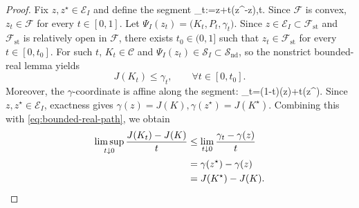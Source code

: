 \documentclass[letterpaper,10pt,conference]{ieeeconf}
\def\[#1\]{\begin{align*}#1\end{align*}}
\providecommand{\cC}{\mathcal{C}}
\providecommand{\cF}{\mathcal{F}}
\providecommand{\cS}{\mathcal{S}}
\providecommand{\cE}{\mathcal{E}}
\renewcommand{\^}[1]{^{(#1)}}
\begin{document}
\vspace{-0.1cm}
\begin{proof}
Fix $z,z^\star\in\cE_I$ and define the segment
\[
z_t:=z+t(z^\star-z),\qquad t\in[0,1].
\]
Since $\cF$ is convex, $z_t\in\cF$ for every $t\in[0,1]$. Let $
\Psi_I(z_t)=\bigl(K_t,P_t,\gamma_t\bigr). $
Since $z\in\cE_I\subset\cF_{\mathrm{st}}$ and $\cF_{\mathrm{st}}$ is relatively open in $\cF$, there exists $t_0\in(0,1]$ such that $z_t\in\cF_{\mathrm{st}}$ for every $t\in[0,t_0]$. For such $t$, $K_t\in\cC$ and $\Psi_I(z_t)\in\cS_I\subset\cS_{\mathrm{nd}}$, so the nonstrict bounded-real lemma yields
\begin{equation}\label{eq:bounded-real-path}
J(K_t)\le \gamma_t,\qquad \forall t\in[0,t_0].
\end{equation}
Moreover, the $\gamma$-coordinate is affine along the segment:
\[
\gamma_t=(1-t)\gamma(z)+t\gamma(z^\star).
\]
Since $z,z^\star\in\cE_I$, exactness gives $
\gamma(z)=J(K), \gamma(z^\star)=J(K^\star).$ Combining this with \eqref{eq:bounded-real-path}, we obtain
\begin{align}
\limsup_{t\downarrow 0}\frac{J(K_t)-J(K)}{t}
&\le \lim_{t\downarrow 0}\frac{\gamma_t-\gamma(z)}{t} \notag\\
&= \gamma(z^\star)-\gamma(z) \notag\\
&= J(K^\star)-J(K). \label{eq:curve-upper}
\end{align}


\end{proof}
\end{document}
